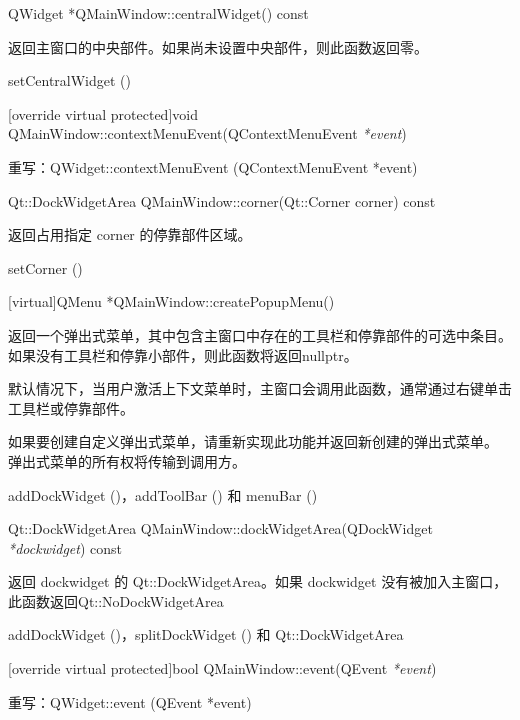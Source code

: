 QWidget *QMainWindow::centralWidget() const

返回主窗口的中央部件。如果尚未设置中央部件，则此函数返回零。

\begin{notice}[另请参阅]
setCentralWidget ()
\end{notice}

\splitLine

[override virtual protected]void QMainWindow::contextMenuEvent(QContextMenuEvent \emph{*event})

重写：QWidget::contextMenuEvent (QContextMenuEvent *event)

Qt::DockWidgetArea QMainWindow::corner(Qt::Corner corner) const

返回占用指定 corner 的停靠部件区域。

\begin{notice}[另请参阅]
setCorner ()
\end{notice}

\splitLine

[virtual]QMenu *QMainWindow::createPopupMenu()

返回一个弹出式菜单，其中包含主窗口中存在的工具栏和停靠部件的可选中条目。如果没有工具栏和停靠小部件，则此函数将返回nullptr。

默认情况下，当用户激活上下文菜单时，主窗口会调用此函数，通常通过右键单击工具栏或停靠部件。

如果要创建自定义弹出式菜单，请重新实现此功能并返回新创建的弹出式菜单。
弹出式菜单的所有权将传输到调用方。

\begin{notice}[另请参阅]
addDockWidget ()，addToolBar () 和 menuBar ()
    \end{notice}
    
\splitLine

Qt::DockWidgetArea QMainWindow::dockWidgetArea(QDockWidget \emph{*dockwidget}) const

返回 dockwidget 的 Qt::DockWidgetArea。如果 dockwidget 没有被加入主窗口，此函数返回Qt::NoDockWidgetArea

\begin{notice}[另请参阅]
addDockWidget ()，splitDockWidget () 和 Qt::DockWidgetArea
\end{notice}

\splitLine

[override virtual protected]bool QMainWindow::event(QEvent \emph{*event})

重写：QWidget::event (QEvent *event)

\splitLine

